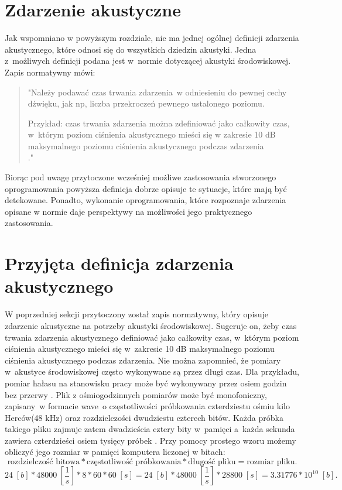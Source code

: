 \documentclass[eng,printmode]{mgr}
\begin{document}
\section{Zdarzenie akustyczne}
Jak wspomniano w powyższym rozdziale, nie ma jednej ogólnej definicji zdarzenia akustycznego, które odnosi się do wszystkich dziedzin akustyki. Jedna z~możliwych definicji podana jest w~normie \cite{PN-ISO-1996-1:2006} dotyczącej akustyki środowiskowej. Zapis normatywny mówi:

\begin{quotation}
"Należy podawać czas trwania zdarzenia~w odniesieniu do pewnej cechy dźwięku, jak np, liczba przekroczeń pewnego ustalonego poziomu. 

Przykład: czas trwania zdarzenia można zdefiniować jako całkowity czas, w~którym poziom ciśnienia akustycznego mieści się w zakresie 10 dB maksymalnego poziomu ciśnienia akustycznego podczas zdarzenia\\\cite{PN-ISO-1996-1:2006}."
\end{quotation}

Biorąc pod uwagę przytoczone wcześniej możliwe zastosowania stworzonego oprogramowania powyższa definicja dobrze opisuje te sytuacje, które mają być detekowane. Ponadto, wykonanie oprogramowania, które rozpoznaje zdarzenia opisane w normie daje perspektywy na możliwości jego praktycznego zastosowania.
\section{Przyjęta definicja zdarzenia akustycznego}
W poprzedniej sekcji przytoczony został zapis normatywny, który opisuje zdarzenie akustyczne na potrzeby akustyki środowiskowej. Sugeruje on, żeby czas trwania zdarzenia akustycznego definiować jako całkowity czas, w~którym poziom ciśnienia akustycznego mieści się w~zakresie 10 dB maksymalnego poziomu ciśnienia akustycznego podczas zdarzenia. 
Nie można zapomnieć, że pomiary w~akustyce środowiskowej często wykonywane są przez długi czas. Dla przykładu, pomiar hałasu na stanowisku pracy może być wykonywany przez osiem godzin bez przerwy \cite{PN-ISO-9612:2011}. Plik z ośmiogodzinnych pomiarów może być monofoniczny, zapisany~w formacie wave~o częstotliwości próbkowania czterdziestu ośmiu kilo Herców(48 kHz) oraz rozdzielczości dwudziestu czterech bitów. Każda próbka takiego pliku zajmuje zatem dwadzieścia cztery bity w~pamięci a~każda sekunda zawiera czterdzieści osiem tysięcy próbek \cite{Principles_of_digital_audio}. Przy pomocy prostego wzoru możemy obliczyć jego rozmiar w pamięci komputera liczonej w bitach:
\begin{equation}
\text{rozdzielczość bitowa} * \text{częstotliwość próbkowania} * \text{długość pliku} = \text{rozmiar pliku}.
\end{equation}
\begin{equation}
24\;[b] * 48000\;[\frac{1}{s}] * 8*60*60\;[s] = 24\;[b] * 48000 \;[\frac{1}{s}] * 28800\;[s] = 3.31776*10^{10} \;[b] .
\end{equation}
\end{document}

